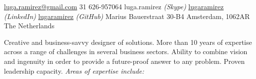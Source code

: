 \documentclass[10pt,a4paper]{article} %
\begin{document}
 



\noindent\href{mailto:luga.ramirez@gmail.com}{luga.ramirez@gmail.com}
\bull \textsmaller{+}31 626-957064
\bull luga.ramirez \textit{(Skype)}
\bull \href{https://www.linkedin.com/in/lugaramirez/}{lugaramirez} \textit{(LinkedIn)}
\bull \href{https://github.com/lugaramirez}{lugaramirez} \textit{(GitHub)}
\bull Marius Bauerstraat 30-B4
\bull Amsterdam, 1062AR
\bull The Netherlands %

\spacedhrule{0.9em}{-0.4em} %



Creative and business-savvy designer of solutions. More than 10 years of expertise across a range of challenges in several business sectors. Ability to combine vision and ingenuity in order to provide a future-proof answer to any problem. Proven leadership capacity. \textit{Areas of expertise include:}

\vspace{-1em} %
\begin{multicols}{2}  %
{}
\end{multicols}
\end{document}
